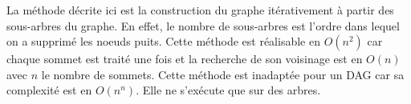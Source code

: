 \newline
La m\'ethode d\'ecrite ici est la construction du graphe it\'erativement \`a partir des sous-arbres du graphe. 
En effet, le nombre de sous-arbres est l'ordre dans lequel on a supprim\'e les noeuds puits. 
Cette m\'ethode est r\'ealisable en $O(n^2)$ car chaque sommet est trait\'e une fois et la recherche de son voisinage est en $O(n)$ avec $n$ le nombre de sommets.
\newline 
Cette m\'ethode est inadapt\'ee pour un DAG car sa complexit\'e est en $O(n^n)$.
Elle ne s'ex\'ecute que sur des arbres.
\newline